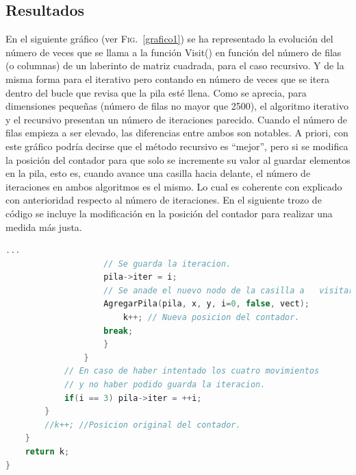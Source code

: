 \documentclass[12pt,a4paper]{article}
\begin{document}
\subsection{Resultados}
En el siguiente gráfico (ver \textsc{Fig.}~\ref{grafico1}) se ha representado la evolución del número de veces que se llama a la función \textsf{Visit()} en función del número de filas (o columnas) de un laberinto de matriz cuadrada, para el caso recursivo. Y de la misma forma para el iterativo pero contando en número de veces que se itera dentro del bucle que revisa que la pila esté llena. Como se aprecia, para dimensiones pequeñas (número de filas no mayor que 2500), el algoritmo iterativo y el recursivo presentan un número de iteraciones parecido. Cuando el número de filas empieza a ser elevado, las diferencias entre ambos son notables. A priori, con este gráfico podría decirse que el método recursivo es ``mejor'', pero si se modifica la posición del contador para que solo se incremente su valor al guardar elementos en la pila, esto es, cuando avance una casilla hacia delante, el número de iteraciones en ambos algoritmos es el mismo. Lo cual es coherente con explicado con anterioridad respecto al número de iteraciones. En el siguiente trozo de código se incluye la modificación en la posición del contador para realizar una medida más justa.

\vspace{0.2cm}
\lstset{style=mystyle}
\begin{lstlisting}[language=C++, title= Implementación de paso de argumentos al \textsf{main()}, frame=single, numbers=none]
					...
					// Se guarda la iteracion.
    				pila->iter = i;
    				// Se anade el nuevo nodo de la casilla a 	visitar.
    				AgregarPila(pila, x, y, i=0, false, vect);
						k++; // Nueva posicion del contador.
    				break;
    				}
				}
    		// En caso de haber intentado los cuatro movimientos
    		// y no haber podido guarda la iteracion.
    		if(i == 3) pila->iter = ++i;
  		}
    	//k++; //Posicion original del contador.
	}
	return k;
}   
\end{lstlisting}
\end{document}
